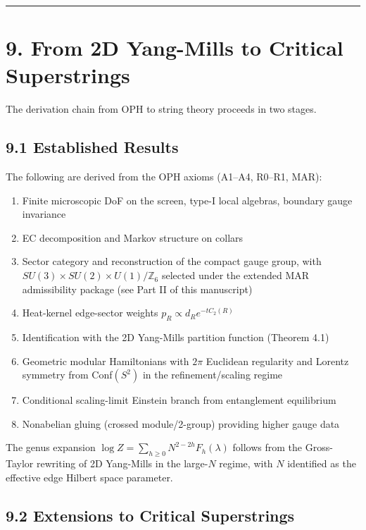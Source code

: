 \begin{center}\rule{0.5\linewidth}{0.5pt}\end{center}

\section{9. From 2D Yang-Mills to Critical Superstrings}\label{9-from-2d-yang-mills-to-critical-superstrings}

The derivation chain from OPH to string theory proceeds in two stages.

\subsection{9.1 Established Results}\label{91-established-results}

The following are derived from the OPH axioms (A1--A4, R0--R1, MAR):

\begin{enumerate}
\def\labelenumi{\arabic{enumi}.}
\tightlist
\item
  Finite microscopic DoF on the screen, type-I local algebras, boundary gauge invariance
\item
  EC decomposition and Markov structure on collars
\item
  Sector category and reconstruction of the compact gauge group, with \(SU(3) \times SU(2) \times U(1)/\mathbb{Z}_6\) selected under the extended MAR admissibility package (see Part II of this manuscript)
\item
  Heat-kernel edge-sector weights \(p_R \propto d_R e^{-t C_2(R)}\)
\item
  Identification with the 2D Yang-Mills partition function (Theorem 4.1)
\item
  Geometric modular Hamiltonians with \(2\pi\) Euclidean regularity and Lorentz symmetry from Conf\((S^2)\) in the refinement/scaling regime
\item
  Conditional scaling-limit Einstein branch from entanglement equilibrium
\item
  Nonabelian gluing (crossed module/2-group) providing higher gauge data
\end{enumerate}

The genus expansion \(\log Z = \sum_{h \geq 0} N^{2-2h} F_h(\lambda)\) follows from the Gross-Taylor rewriting of 2D Yang-Mills in the large-\(N\) regime, with \(N\) identified as the effective edge Hilbert space parameter.

\subsection{9.2 Extensions to Critical Superstrings}\label{92-extensions-to-critical-superstrings}

